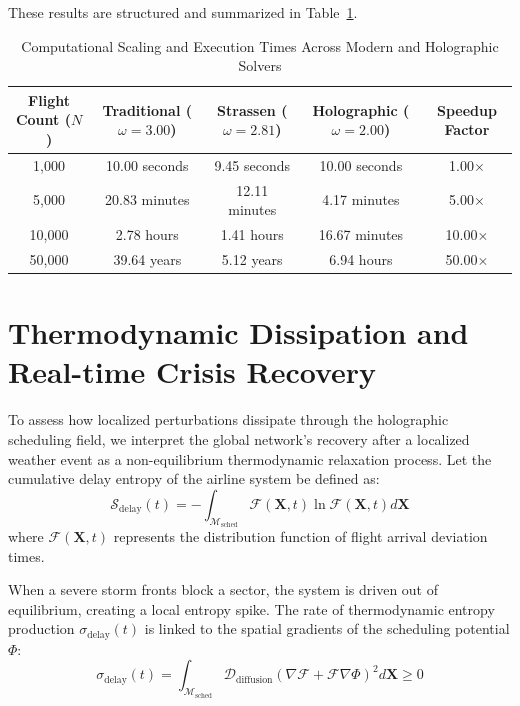 \documentclass[11pt,a4paper]{book}
\begin{document}
These results are structured and summarized in Table~\ref{tab:computational_scaling}.

\begin{table}[htbp]
\centering
\caption{Computational Scaling and Execution Times Across Modern and Holographic Solvers}
\label{tab:computational_scaling}
\vspace{0.2cm}
\begin{tabular}{ccccc}
\hline \hline
\textbf{Flight Count ($N$)} & \textbf{Traditional ($\omega = 3.00$)} & \textbf{Strassen ($\omega = 2.81$)} & \textbf{Holographic ($\omega = 2.00$)} & \textbf{Speedup Factor} \\ \hline
1,000 & 10.00 seconds & 9.45 seconds & 10.00 seconds & 1.00$\times$ \\
5,000 & 20.83 minutes & 12.11 minutes & 4.17 minutes & 5.00$\times$ \\
10,000 & 2.78 hours & 1.41 hours & 16.67 minutes & 10.00$\times$ \\
50,000 & 39.64 years & 5.12 years & 6.94 hours & 50.00$\times$ \\
\hline \hline
\end{tabular}
\end{table}

\section{Thermodynamic Dissipation and Real-time Crisis Recovery}\label{sec:thermodynamics}

To assess how localized perturbations dissipate through the holographic scheduling field, we interpret the global network's recovery after a localized weather event as a non-equilibrium thermodynamic relaxation process. Let the cumulative delay entropy of the airline system be defined as:
\begin{equation}
\label{eq:network_entropy}
\mathcal{S}_{\text{delay}}(t) = -\int_{\mathcal{M}_{\text{sched}}} \mathcal{F}(\mathbf{X}, t) \ln \mathcal{F}(\mathbf{X}, t) d\mathbf{X}
\end{equation}
where $\mathcal{F}(\mathbf{X}, t)$ represents the distribution function of flight arrival deviation times.

When a severe storm fronts block a sector, the system is driven out of equilibrium, creating a local entropy spike. The rate of thermodynamic entropy production $\sigma_{\text{delay}}(t)$ is linked to the spatial gradients of the scheduling potential $\Phi$:
\begin{equation}
\label{eq:entropy_production}
\sigma_{\text{delay}}(t) = \int_{\mathcal{M}_{\text{sched}}} \mathcal{D}_{\text{diffusion}} \left( \nabla \mathcal{F} + \mathcal{F} \nabla \Phi \right)^2 d\mathbf{X} \ge 0
\end{equation}
\end{document}
